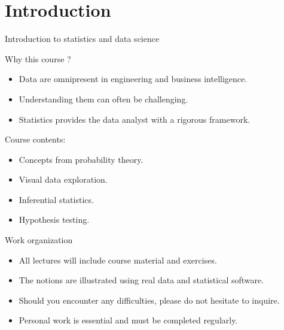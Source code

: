 \section{Introduction}



\begin{frame}[fragile]{Introduction to statistics and data science}
\begin{block}{Why this course ?}
\begin{itemize}
    \item<+-> Data are omnipresent in engineering and business intelligence.
    \item<+-> Understanding them can often be challenging.
    \item<+-> Statistics provides the data analyst with a rigorous framework.
\end{itemize}
\end{block}
\begin{block}{Course contents:}
\begin{itemize}
    \item<+-> Concepts from probability theory.
    \item<+-> Visual data exploration.
    \item<+-> Inferential statistics.
    \item<+-> Hypothesis testing.
\end{itemize}
\end{block}
\end{frame}

\begin{frame}[fragile]{Work organization}
\begin{itemize}
    \item<+-> All lectures will include course material and exercises.
    \item<+-> The notions are illustrated using real data and statistical software.
    \item<+->Should you encounter any difficulties, please do not hesitate to inquire.
    \item<+->Personal work is essential and must be completed regularly.
\end{itemize}
\end{frame}

